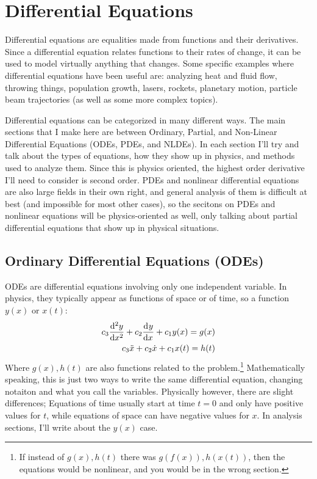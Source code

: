 
\section{Differential Equations} 
    Differential equations are equalities made from functions and their derivatives. Since a differential equation relates  functions to their rates of change, it can be used to model virtually anything that changes. Some specific examples where differential equations have been useful are: analyzing heat and fluid flow, throwing things, population growth, lasers, rockets, planetary motion, particle beam trajectories (as well as some more complex topics).
    \par
    Differential equations can be categorized in many different ways. The main sections that I make here are between Ordinary, Partial, and Non-Linear Differential Equations (ODEs, PDEs, and NLDEs). In each section I'll try and talk about the types of equations, how they show up in physics, and methods used to analyze them. Since this is physics oriented, the highest order derivative I'll need to consider is second order. PDEs and nonlinear differential equations are also large fields in their own right, and general analysis of them is difficult at best (and impossible for most other cases), so the secitons on PDEs and nonlinear equations will be physics-oriented as well, only talking about partial differential equations that show up in physical situations. 
\par
%

\subsection{Ordinary Differential Equations (ODEs)}
    ODEs are differential equations involving only one independent variable. In physics, they typically appear as functions of space or of time, so a function $y(x)$ or $x(t)$: 
    \begin{align}
        c_3\der[2]{y}{x}+c_2\der{y}{x}+c_1y(x)=g(x)\label{eqn:ode}
        \\
        c_3\Ddot{x}+c_2\dot{x}+c_1x(t)=h(t)\notag
    \end{align}
    Where $g(x),h(t)$ are also functions related to the problem.\footnote{If instead of $g(x),h(t)$ there was $g(f(x)),h(x(t))$, then the equations would be nonlinear, and you would be in the wrong section.} Mathematically speaking, this is just two ways to write the same differential equation, changing notaiton and what you call the variables. Physically however, there are slight differences; Equations of time usually start at time $t=0$ and only have positive values for $t$, while equations of space can have negative values for $x$. In analysis sections, I'll write about the $y(x)$ case.
